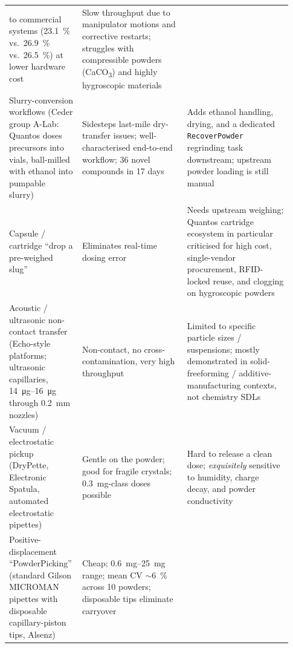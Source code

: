 \documentclass[11pt,a4paper]{article}
\begin{document}
\begin{small}
\begin{longtable}{@{}p{0.21\linewidth}p{0.36\linewidth}p{0.36\linewidth}@{}}
to commercial systems (\SI{23.1}{\percent} vs.\ \SI{26.9}{\percent} vs.\
\SI{26.5}{\percent}) at lower hardware
cost~\cite{jiang2023autonomousbiomimeticsolid} &
Slow throughput due to manipulator motions and corrective restarts;
struggles with compressible powders (CaCO\textsubscript{3}) and highly
hygroscopic materials~\cite{jiang2023autonomousbiomimeticsolid} \\
\addlinespace
Slurry-conversion workflows (Ceder group A-Lab: Quantos doses precursors
into vials, ball-milled with ethanol into pumpable
slurry)~\cite{szymanski2023anautonomouslaboratory,szymanski2024automatingthesynthesis,fei2024alabosapythonbased} &
Sidesteps last-mile dry-transfer issues; well-characterised end-to-end
workflow; 36 novel compounds in 17 days &
Adds ethanol handling, drying, and a dedicated \texttt{RecoverPowder}
regrinding task downstream; upstream powder loading is still
manual~\cite{szymanski2024automatingthesynthesis} \\
\addlinespace
Capsule / cartridge ``drop a pre-weighed slug'' &
Eliminates real-time dosing error &
Needs upstream weighing; Quantos cartridge ecosystem in particular
criticised for high cost, single-vendor procurement, RFID-locked reuse,
and clogging on hygroscopic
powders~\cite{carruthers2025amobilerobotic} \\
\addlinespace
Acoustic / ultrasonic non-contact transfer (Echo-style platforms; ultrasonic
capillaries, \SIrange{14}{16}{\micro\gram} through \SI{0.2}{\milli\meter}
nozzles)~\cite{yang2007meteringanddispensing} &
Non-contact, no cross-contamination, very high throughput &
Limited to specific particle sizes / suspensions; mostly demonstrated in
solid-freeforming / additive-manufacturing contexts, not chemistry SDLs \\
\addlinespace
Vacuum / electrostatic pickup (DryPette, Electronic Spatula, automated
electrostatic pipettes)~\cite{yang2007meteringanddispensing,alsenz2011powderpickinganinexpensive} &
Gentle on the powder; good for fragile crystals; \SI{0.3}{\milli\gram}-class
doses possible &
Hard to release a clean dose; \emph{exquisitely} sensitive to humidity,
charge decay, and powder conductivity~\cite{yang2007meteringanddispensing} \\
\addlinespace
Positive-displacement ``PowderPicking'' (standard Gilson MICROMAN pipettes
with disposable capillary-piston tips,
Alsenz)~\cite{alsenz2011powderpickinganinexpensive,cook2021guideto} &
Cheap; \SIrange{0.6}{25}{\milli\gram} range; mean CV \(\sim\)\SI{6}{\percent}
across 10 powders; disposable tips eliminate carryover &

\end{longtable}
\end{small}
\end{document}
